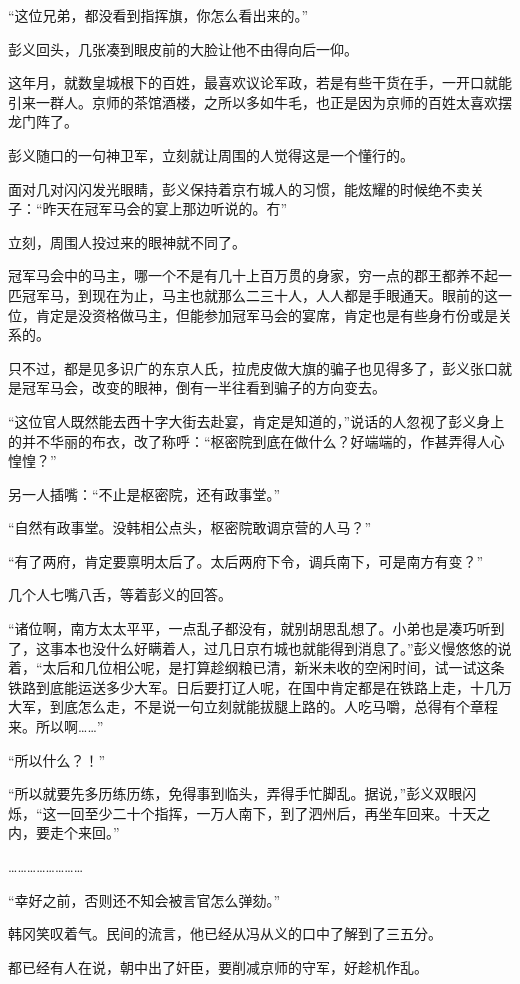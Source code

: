 “这位兄弟，都没看到指挥旗，你怎么看出来的。”

彭义回头，几张凑到眼皮前的大脸让他不由得向后一仰。

这年月，就数皇城根下的百姓，最喜欢议论军政，若是有些干货在手，一开口就能引来一群人。京师的茶馆酒楼，之所以多如牛毛，也正是因为京师的百姓太喜欢摆龙门阵了。

彭义随口的一句神卫军，立刻就让周围的人觉得这是一个懂行的。

面对几对闪闪发光眼睛，彭义保持着京冇城人的习惯，能炫耀的时候绝不卖关子：“昨天在冠军马会的宴上那边听说的。冇”

立刻，周围人投过来的眼神就不同了。

冠军马会中的马主，哪一个不是有几十上百万贯的身家，穷一点的郡王都养不起一匹冠军马，到现在为止，马主也就那么二三十人，人人都是手眼通天。眼前的这一位，肯定是没资格做马主，但能参加冠军马会的宴席，肯定也是有些身冇份或是关系的。

只不过，都是见多识广的东京人氏，拉虎皮做大旗的骗子也见得多了，彭义张口就是冠军马会，改变的眼神，倒有一半往看到骗子的方向变去。

“这位官人既然能去西十字大街去赴宴，肯定是知道的，”说话的人忽视了彭义身上的并不华丽的布衣，改了称呼：“枢密院到底在做什么？好端端的，作甚弄得人心惶惶？”

另一人插嘴：“不止是枢密院，还有政事堂。”

“自然有政事堂。没韩相公点头，枢密院敢调京营的人马？”

“有了两府，肯定要禀明太后了。太后两府下令，调兵南下，可是南方有变？”

几个人七嘴八舌，等着彭义的回答。

“诸位啊，南方太太平平，一点乱子都没有，就别胡思乱想了。小弟也是凑巧听到了，这事本也没什么好瞒着人，过几日京冇城也就能得到消息了。”彭义慢悠悠的说着，“太后和几位相公呢，是打算趁纲粮已清，新米未收的空闲时间，试一试这条铁路到底能运送多少大军。日后要打辽人呢，在国中肯定都是在铁路上走，十几万大军，到底怎么走，不是说一句立刻就能拔腿上路的。人吃马嚼，总得有个章程来。所以啊……”

“所以什么？！”

“所以就要先多历练历练，免得事到临头，弄得手忙脚乱。据说，”彭义双眼闪烁，“这一回至少二十个指挥，一万人南下，到了泗州后，再坐车回来。十天之内，要走个来回。”

……………………

“幸好之前，否则还不知会被言官怎么弹劾。”

韩冈笑叹着气。民间的流言，他已经从冯从义的口中了解到了三五分。

都已经有人在说，朝中出了奸臣，要削减京师的守军，好趁机作乱。

